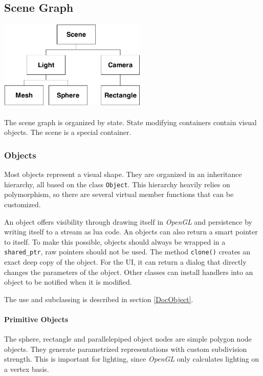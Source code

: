 \subsection{Scene Graph\label{SceneGraph}}

\begin{center}
\includegraphics[width=7cm]{media/scene.pdf}
\end{center}

\paragraph{}
The scene graph is organized by state.
State modifying containers contain visual objects.
The scene is a special container.

\subsubsection{Objects\label{ImplObject}}
Most objects represent a visual shape.
They are organized in an inheritance hierarchy, all based on the class \texttt{Object}.
This hierarchy heavily relies on polymorphism, so there are several virtual member functions that can be customized.

An object offers visibility through drawing itself in \textit{OpenGL} and persistence by writing itself to a stream as lua code.
An objects can also return a smart pointer to itself.
To make this possible, objects should always be wrapped in a \lstinline{shared_ptr}, raw pointers should not be used.
The method \lstinline{clone()} creates an exact deep copy of the object.
For the UI, it can return a dialog that directly changes the parameters of the object.
Other classes can install handlers into an object to be notified when it is modified.

The use and subclassing is described in section \ref{DocObject}.

\paragraph{Primitive Objects}
The sphere, rectangle and parallelepiped object nodes are simple polygon node objects.
They generate parametrized representations with custom subdivision strength.
This is important for lighting, since \textit{OpenGL} only calculates lighting on a vertex basis.

